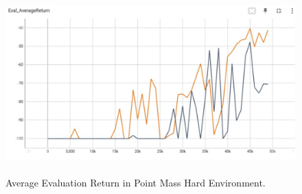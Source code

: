 \documentclass{article}
\begin{document}
\begin{answer}[title=Plot,height=9.5cm,width=\linewidth]
    \begin{figure}[H]
        \centering
        \includegraphics[height=7cm]{figs/P6_hard_return.pdf}
        \caption{Average Evaluation Return in Point Mass Hard Environment.
            \color{orange}{Orange: RND.}
            \color{gray}{Gray: Random.}}
    \end{figure}
\end{answer}
\end{document}
